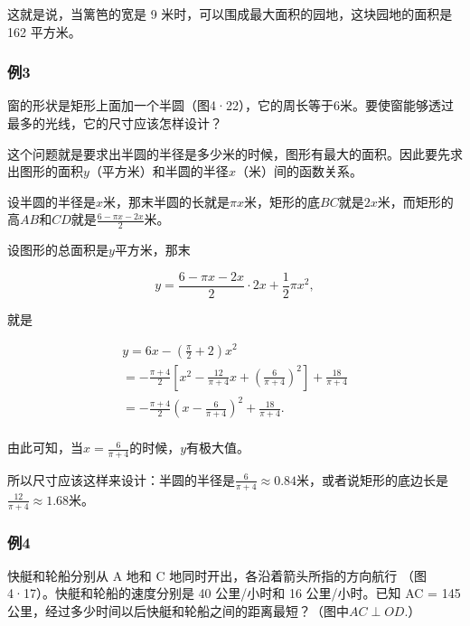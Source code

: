这就是说，当篱笆的宽是 9 米时，可以围成最大面积的园地，这块园地的面积是
162 平方米。

\subsubsection{例3}

窗的形状是矩形上面加一个半圆（图4·22），它的周长等于6米。要使窗能够透过最多的光线，它的尺寸应该怎样设计？

这个问题就是要求出半圆的半径是多少米的时候，图形有最大的面积。因此要先求出图形的面积\(y\)（平方米）和半圆的半径\(x\)（米）间的函数关系。

设半圆的半径是\(x\)米，那末半圆的长就是\(\pi x\)米，矩形的底\(BC\)就是\(2x\)米，而矩形的高\(AB\)和\(CD\)就是\(\frac{6 - \pi x - 2x}{2}\)米。

设图形的总面积是\(y\)平方米，那末

\[
y = \frac{6 - \pi x - 2 x}{2} \cdot 2 x + \frac{1}{2} \pi x^{2},
\]

就是

\[
\begin{array}{l} y = 6 x - \left(\frac{\pi}{2} + 2\right) x^{2} \\ = - \frac{\pi + 4}{2} \left[ x^{2} - \frac{12}{\pi + 4} x + \left(\frac{6}{\pi + 4}\right)^{2} \right] + \frac{18}{\pi + 4} \\ = - \frac{\pi + 4}{2} \left(x - \frac{6}{\pi + 4}\right)^{2} + \frac{18}{\pi + 4}. \\ \end{array}
\]

由此可知，当\(x = \frac{6}{\pi + 4}\)的时候，\(y\)有极大值。

所以尺寸应该这样来设计：半圆的半径是\(\frac{6}{\pi+4} \approx 0.84\)米，或者说矩形的底边长是\(\frac{12}{\pi+4}\approx1.68\)米。

\subsubsection{例4}

快艇和轮船分别从 A 地和 C 地同时开出，各沿着箭头所指的方向航行 （图4·17）。快艇和轮船的速度分别是 40 公里/小时和 16 公里/小时。已知 AC =
145
公里，经过多少时间以后快艇和轮船之间的距离最短？（图中\(AC \perp OD\).）

